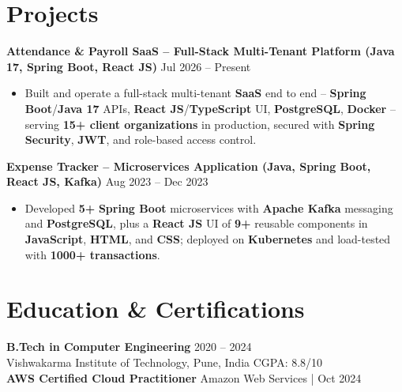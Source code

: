 \documentclass[a4paper,10pt]{article}
\begin{document}
\section*{Projects}

\textbf{Attendance \& Payroll SaaS -- Full-Stack Multi-Tenant Platform (Java 17, Spring Boot, React JS)} \hfill Jul 2026 -- Present
\begin{itemize}[leftmargin=*]
    \item Built and operate a full-stack multi-tenant \textbf{SaaS} end to end -- \textbf{Spring Boot}/\textbf{Java 17} APIs, \textbf{React JS}/\textbf{TypeScript} UI, \textbf{PostgreSQL}, \textbf{Docker} -- serving \textbf{15+ client organizations} in production, secured with \textbf{Spring Security}, \textbf{JWT}, and role-based access control.
\end{itemize}

\textbf{Expense Tracker -- Microservices Application (Java, Spring Boot, React JS, Kafka)} \hfill Aug 2023 -- Dec 2023
\begin{itemize}[leftmargin=*]
    \item Developed \textbf{5+} \textbf{Spring Boot} microservices with \textbf{Apache Kafka} messaging and \textbf{PostgreSQL}, plus a \textbf{React JS} UI of \textbf{9+} reusable components in \textbf{JavaScript}, \textbf{HTML}, and \textbf{CSS}; deployed on \textbf{Kubernetes} and load-tested with \textbf{1000+ transactions}.
\end{itemize}

\section*{Education \& Certifications}
\textbf{B.Tech in Computer Engineering} \hfill 2020 -- 2024 \\
Vishwakarma Institute of Technology, Pune, India \hfill CGPA: 8.8/10 \\
\textbf{AWS Certified Cloud Practitioner} \hfill Amazon Web Services \;|\; Oct 2024
\end{document}
